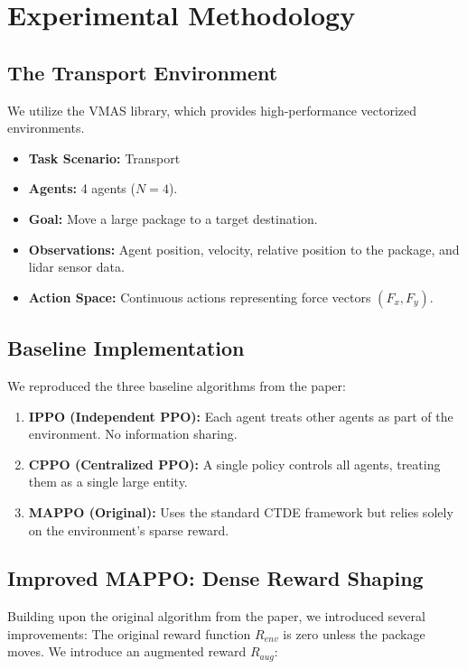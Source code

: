\documentclass[12pt, a4paper]{article}
\begin{document}
\section{Experimental Methodology}

\subsection{The Transport Environment}
We utilize the VMAS library, which provides high-performance vectorized environments.
\begin{itemize}
    \item \textbf{Task Scenario:} Transport
    \item \textbf{Agents:} 4 agents ($N=4$).
    \item \textbf{Goal:} Move a large package to a target destination.
    \item \textbf{Observations:} Agent position, velocity, relative position to the package, and lidar sensor data.
    \item \textbf{Action Space:} Continuous actions representing force vectors $(F_x, F_y)$.
\end{itemize}

\subsection{Baseline Implementation}
We reproduced the three baseline algorithms from the paper:
\begin{enumerate}
    \item \textbf{IPPO (Independent PPO):} Each agent treats other agents as part of the environment. No information sharing.
    \item \textbf{CPPO (Centralized PPO):} A single policy controls all agents, treating them as a single large entity.
    \item \textbf{MAPPO (Original):} Uses the standard CTDE framework but relies solely on the environment's sparse reward.
\end{enumerate}

\subsection{Improved MAPPO: Dense Reward Shaping}
Building upon the original algorithm from the paper, we introduced several improvements: The original reward function $R_{env}$ is zero unless the package moves. We introduce an augmented reward $R_{aug}$:
\end{document}
